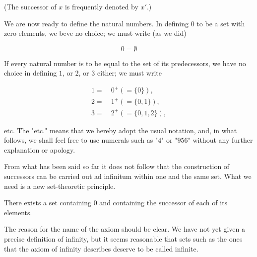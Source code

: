 (The successor of $x$ is frequently denoted by $x'$.) 

We are now ready to define the natural numbers. In defining $0$ to be a set with zero elements, we beve no choice; we must write (as we did) 

\begin{equation*}
0 = \emptyset
\end{equation*}

If every natural number is to be equal to the set of its predecessors, we have no choice in defining $1$, or $2$, or $3$ either; we must write

\begin{align*}
1 =& \: 0^{+}(= \{ 0 \} ), \\
2 =& \: 1^{+}(= \{ 0, 1 \} ), \\
3 =& \: 2^{+}(= \{ 0, 1, 2 \} ),
\end{align*}

etc. The "etc." means that we hereby adopt the usual notation, and, in what follows, we shall feel free to use numerals such as "$4$" or "$956$" without any further explanation or apology. 

From what has been said so far it does not follow that the construction of successors can be carried out ad infinitum within one and the same set. What we need is a new set-theoretic principle. 

\begin{named} There exists a set containing $0$ and containing the successor of each of its elements.
\end{named} 

The reason for the name of the axiom should be clear. We have not yet given a precise definition of infinity, but it seems reasonable that sets such as the ones that the axiom of infinity describes deserve to be called infinite.

